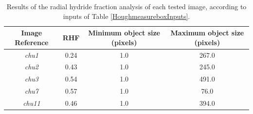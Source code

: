 \documentclass{article}
\begin{document}
    \begin{table}[ht]
	    \begin{center}
	    \begin{tabular}{ |c|c|c|c| } 
		    \hline
		    \textbf{Image Reference} & \textbf{RHF} & \textbf{Minimum object size (pixels)} & \textbf{Maximum object size (pixels)} \\
		    \hline
		    \textit{chu1} & 0.24 & 1.0 & 267.0 \\
		    \hline
		    \textit{chu2} & 0.43 & 1.0 & 245.0 \\
		    \hline
		    \textit{chu3} & 0.54 & 1.0 & 491.0 \\ 
		    \hline
		    \textit{chu7} & 0.57 & 1.0 & 76.0 \\ 
		    \hline
		    \textit{chu11} & 0.46 & 1.0 & 394.0 \\ 
		    \hline
	    \end{tabular}
	    \caption{Results of the radial hydride fraction analysis of each tested image, according to inputs of Table \ref{HoughmeasureboxInputs}. }
	    \label{tab:RHF_results}
	    \end{center}
    \end{table}
\end{document}
